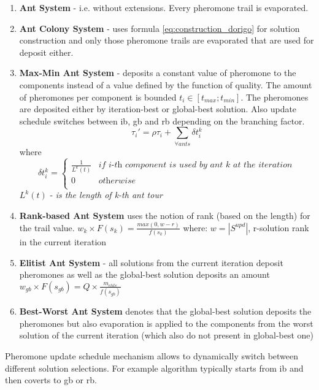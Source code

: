 \begin{enumerate}
\item {\textbf{Ant System} - i.e. without extensions. Every pheromone trail is evaporated.}

\item {\textbf{Ant Colony System} - uses formula \ref{eq:construction_dorigo} for solution construction and only those pheromone trails are evaporated that are used for deposit either.}

\item \textbf{Max-Min Ant System} - deposits a constant value of pheromone to the components instead of a value defined by the function of quality. The amount of pheromones per component is bounded $t_i \in [t_{max};t_{min}]$. The pheromones are deposited either by iteration-best or global-best solution. Also update schedule switches between ib, gb and rb depending on the branching factor.
\begin{equation}
\tau_i' = \rho \tau_i + \sum \limits_{\forall ants} \delta t_i^k
\end{equation}
where
\[
\delta t_i^k =
\left\{
\begin{array}{ll}
      \frac{1}{L^k(t)} & \textit{if i-th component is used by ant k at the iteration}\\
      0 & \textit{otherwise} \\
\end{array} 
\right. 
\]
$L^k(t)$ - \textit{is the length of k-th ant tour}

\item {\textbf{Rank-based Ant System} uses the notion of rank (based on the length) for the trail value.
$w_k \times F(s_k) = \frac{max(0,w-r)}{f(s_k)}$
where: $w=|S^{upd}|$, r-solution rank in the current iteration
}

\item {\textbf{Elitist Ant System} - all solutions from the current iteration deposit pheromones as well as the global-best solution deposits an amount $w_{gb} \times F(s_{gb}) = Q \times \frac{m_{elite}}{f(s_{gb})}$ }

\item {\textbf{Best-Worst Ant System} denotes that the global-best solution deposits the pheromones but also evaporation is applied to the components from the worst solution of the current iteration (which also do not present in global-best one)}

\end{enumerate}

Pheromone update schedule mechanism allows to dynamically switch between different solution selections. For example algorithm typically starts from ib and then coverts to gb or rb.



